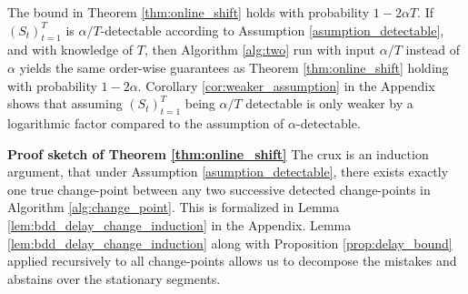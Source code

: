 {\color{black}
\begin{remark}
      The bound in Theorem \ref{thm:online_shift} holds with probability $1-2\alpha T$. If $(S_t)_{t=1}^T$ is $\alpha/T$-detectable according to Assumption \ref{asumption_detectable}, and with knowledge of $T$, then Algorithm \ref{alg:two} run with input $\alpha/T$ instead of $\alpha$ yields the same order-wise guarantees as Theorem \ref{thm:online_shift} holding with probability $1-2\alpha$. Corollary \ref{cor:weaker_assumption} in the Appendix shows that assuming $(S_t)_{t=1}^T$ being $\alpha/T$ detectable is only weaker by a logarithmic factor compared to the assumption of $\alpha$-detectable.
\end{remark}


}

\textbf{Proof sketch of Theorem \ref{thm:online_shift}} The crux is an induction argument, that under Assumption \ref{asumption_detectable}, there exists exactly one true change-point between any two successive detected change-points in Algorithm \ref{alg:change_point}. This is formalized in Lemma \ref{lem:bdd_delay_change_induction} in the Appendix. Lemma \ref{lem:bdd_delay_change_induction} along with Proposition \ref{prop:delay_bound} applied recursively to all change-points allows us to decompose the mistakes and abstains over the stationary segments.





